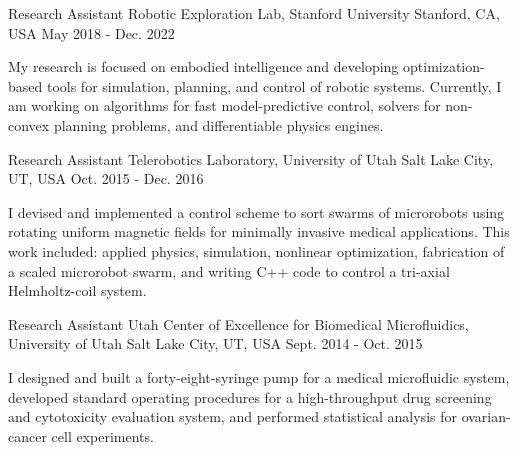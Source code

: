 

\begin{cventries}

  \cventry
    {Research Assistant} %
    {Robotic Exploration Lab, Stanford University} %
    {Stanford, CA, USA} %
    {May 2018 - Dec. 2022} %
    {
      \begin{cvitems} %
      My research is focused on embodied intelligence and developing optimization-based tools for simulation, planning, and control of robotic systems. Currently, I am working on algorithms for fast model-predictive control, solvers for non-convex planning problems, and differentiable physics engines. 
      \end{cvitems}
    }
    
  \cventry
    {Research Assistant} %
    {Telerobotics Laboratory, University of Utah} %
    {Salt Lake City, UT, USA} %
    {Oct. 2015 - Dec. 2016} %
    {
      \begin{cvitems} %
      I devised and implemented a control scheme to sort swarms of microrobots using rotating uniform magnetic fields for minimally invasive medical applications. This work included: applied physics, simulation, nonlinear optimization, fabrication of a scaled microrobot swarm, and writing C++ code to control a tri-axial Helmholtz-coil system.
      \end{cvitems}
    }
    
  \cventry
    {Research Assistant} %
    {Utah Center of Excellence for Biomedical Microfluidics, University of Utah} %
    {Salt Lake City, UT, USA} %
    {Sept. 2014 - Oct. 2015} %
    {
      \begin{cvitems} %
      I designed and built a forty-eight-syringe pump for a medical microfluidic system, developed standard operating procedures for a high-throughput drug screening and cytotoxicity evaluation system, and performed statistical analysis for ovarian-cancer cell experiments.
      \end{cvitems}
    }

\end{cventries}

